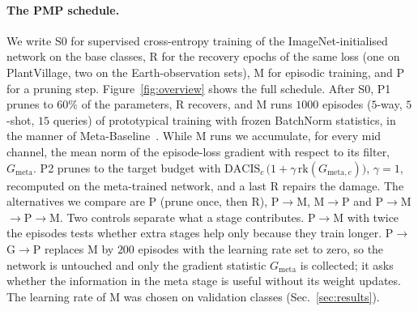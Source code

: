 \paragraph{The PMP schedule.}
We write S0 for supervised cross-entropy training of the ImageNet-initialised network on the base classes, R for the recovery epochs of the same loss (one on PlantVillage, two on the Earth-observation sets), M for episodic training, and P for a pruning step. Figure~\ref{fig:overview} shows the full schedule. After S0, P1 prunes to $60\%$ of the parameters, R recovers, and M runs $1000$ episodes ($5$-way, $5$-shot, $15$ queries) of prototypical training with frozen BatchNorm statistics, in the manner of Meta-Baseline~\cite{chen2021metabaseline}. While M runs we accumulate, for every mid channel, the mean norm of the episode-loss gradient with respect to its filter, $G_{\mathrm{meta}}$. P2 prunes to the target budget with
$\mathrm{DACIS}_c\,\bigl(1+\gamma\,\mathrm{rk}(G_{\mathrm{meta},c})\bigr)$, $\gamma{=}1$, recomputed on the meta-trained network, and a last R repairs the damage. The alternatives we compare are P (prune once, then R), P$\to$M, M$\to$P and P$\to$M$\to$P$\to$M. Two controls separate what a stage contributes. P$\to$M with twice the episodes tests whether extra stages help only because they train longer. P$\to$G$\to$P replaces M by $200$ episodes with the learning rate set to zero, so the network is untouched and only the gradient statistic $G_{\mathrm{meta}}$ is collected; it asks whether the information in the meta stage is useful without its weight updates. The learning rate of M was chosen on validation classes (Sec.~\ref{sec:results}).
